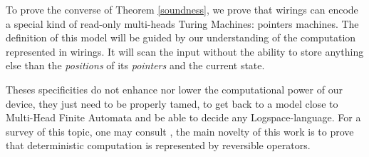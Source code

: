 To prove the converse of Theorem \ref{soundness}, we prove that wirings can encode a special kind of read-only multi-heads Turing Machines: pointers machines.
The definition of this model will be guided by our understanding of the computation represented in wirings.
It will scan the input without the ability to store anything else than the \emph{positions} of its \emph{pointers} and the current state.

Theses specificities do not enhance nor lower the computational power of our device, they just need to be properly tamed, to get back to a model close to Multi-Head Finite Automata and be able to decide any {\sc Logspace}-language.
For a survey of this topic, one may consult \cite[Chap.4]{Aubert2013b}, the main novelty of this work is to prove that deterministic computation is represented by reversible operators.



